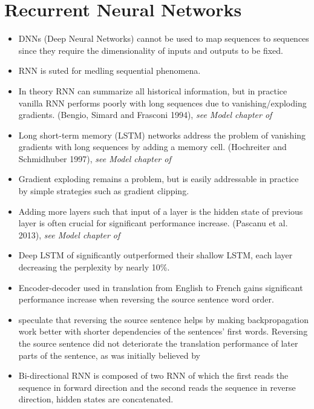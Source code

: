 \documentclass[12pt,a4paper,english
]{tutthesis}
\begin{document}
\section{Recurrent Neural Networks}
\label{se:recurrent_neural_networks}
\begin{itemize}
\item DNNs (Deep Neural Networks) cannot be used to map sequences to sequences since they require the dimensionality of inputs and outputs to be fixed. \cite{Sutskever2014}
\item RNN is suted for medling sequential phenomena. \cite{Kim2016}
\item In theory RNN can summarize all historical information, but in practice vanilla RNN performs poorly with long sequences due to vanishing/exploding gradients. (Bengio, Simard and Frasconi 1994), \textit{see Model chapter of \cite{Kim2016}}
\item Long short-term memory (LSTM) networks address the problem of vanishing gradients with long sequences by adding a memory cell. (Hochreiter and Schmidhuber 1997), \textit{see Model chapter of \cite{Kim2016}}
\item Gradient exploding remains a problem, but is easily addressable in practice by simple strategies such as gradient clipping. \cite{Kim2016}
\item Adding more layers such that input of a layer is the hidden state of previous layer is often crucial for significant performance increase. (Pascanu et al. 2013), \textit{see Model chapter of \cite{Kim2016}}
\item Deep LSTM of \cite{Sutskever2014} significantly outperformed their shallow LSTM, each layer decreasing the perplexity by nearly 10\%.
\item Encoder-decoder used in translation from English to French gains significant performance increase when reversing the source sentence word order. \cite{Sutskever2014}
\item \cite{Sutskever2014} speculate that reversing the source sentence helps by making backpropagation work better with shorter dependencies of the sentences' first words. Reversing the source sentence did not deteriorate the translation performance of later parts of the sentence, as was initially believed by \cite{Sutskever2014}
\item Bi-directional RNN is composed of two RNN of which the first reads the sequence in forward direction and the second reads the sequence in reverse direction, hidden states are concatenated. \cite{Chung2016}
\end{itemize}
\end{document}
